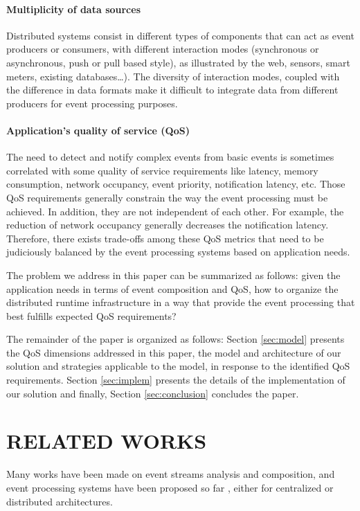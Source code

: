 \documentclass[a4paper,twoside]{article}
\begin{document}
\paragraph{Multiplicity of data sources}
Distributed systems consist in different types of components that can act as event producers or consumers, with different interaction modes (synchronous or asynchronous, push or pull based style), as illustrated by the web, sensors, smart meters, existing databases…). The diversity of interaction modes, coupled with the difference in data formats make it difficult to integrate data from different producers for event processing purposes.
\paragraph{Application’s quality of service (QoS)}
The need to detect and notify complex events from basic events is sometimes correlated with some quality of service requirements like latency, memory consumption, network occupancy, event priority, notification latency, etc. Those QoS requirements generally constrain the way the event processing must be achieved. In addition, they are not independent of each other. For example, the reduction of network occupancy generally decreases the notification latency. Therefore, there exists trade-offs among these QoS metrics that need to be judiciously balanced by the event processing systems based on application needs.

The problem we address in this paper can be summarized as follows: given the application needs in terms of event composition and QoS, how to organize the distributed runtime infrastructure in a way that provide the event processing that best fulfills expected QoS requirements?

The remainder of the paper is organized as follows: Section \ref{sec:model} presents the QoS dimensions addressed in this paper, the model and architecture of our solution and strategies applicable to the 
model, in response to the identified QoS requirements. Section \ref{sec:implem} presents the details of the implementation of our solution and finally, Section \ref{sec:conclusion} concludes the paper.

\section{\uppercase{Related Works}}
\label{sec:related_works}
Many works have been made on event streams analysis and composition, and event processing systems have been proposed so far \cite{Esper,Streambase,Cugola2009,Gyllstrom2006,Oracle}, either for centralized or distributed architectures. 
\end{document}
